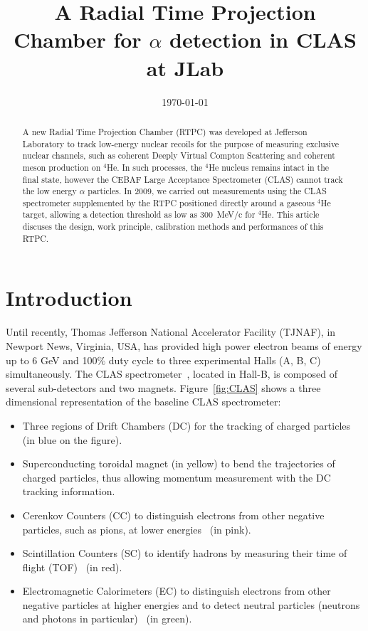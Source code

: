 \documentclass[preprint,5p]{elsarticle}
\begin{document}
\title{\vspace{-15mm}\fontsize{24pt}{10pt}\selectfont\textbf{A Radial Time 
Projection Chamber for $\alpha$ detection in CLAS at JLab}}
  

\date{\today}

\begin{abstract}
A new Radial Time Projection Chamber (RTPC) was developed at Jefferson 
Laboratory to track low-energy nuclear recoils for the purpose of measuring
exclusive nuclear channels, such as coherent Deeply Virtual Compton Scattering
and coherent meson production on $^4$He. In such processes, the $^4$He nucleus
remains intact in the final state, however the CEBAF Large
Acceptance Spectrometer (CLAS) cannot track the low energy $\alpha$ particles. In
2009, we carried out measurements using the CLAS spectrometer supplemented by
the RTPC positioned directly around a gaseous $^4$He target, allowing a detection
threshold as low as 300~MeV/c for $^4$He. This article discuses the design,
work principle, calibration methods and performances of this RTPC.
\end{abstract}

\maketitle

\section{Introduction} \label{sec:level1}

Until recently, Thomas Jefferson National Accelerator Facility (TJNAF), in 
Newport News, Virginia, USA, has provided high power electron beams of energy 
up to 6 GeV and 100$\%$ duty cycle to three experimental Halls (A, B, C) 
simultaneously. The CLAS spectrometer~\cite{CLASref}, located
in Hall-B, is composed of several sub-detectors and two magnets. 
Figure~\ref{fig:CLAS} shows a three dimensional 
representation of the baseline CLAS spectrometer:
\begin{itemize}
 \item Three regions of Drift Chambers (DC) for the tracking of charged 
    particles~\cite{DCref} (in blue on the figure).
 \item Superconducting toroidal magnet (in yellow) to bend the trajectories 
    of charged particles, thus allowing momentum measurement with the DC tracking information.
 \item Cerenkov Counters (CC) to distinguish electrons from other negative 
    particles, such as pions, at lower energies~\cite{CCref} (in pink).
 \item Scintillation Counters (SC) to identify hadrons by measuring their 
    time of flight (TOF)~\cite{TOFref} (in red).
 \item Electromagnetic Calorimeters (EC) to distinguish electrons from other negative 
    particles at higher energies and to detect neutral particles (neutrons and 
    photons in particular)~\cite{ECref} (in green).
\end{itemize}
\end{document}
